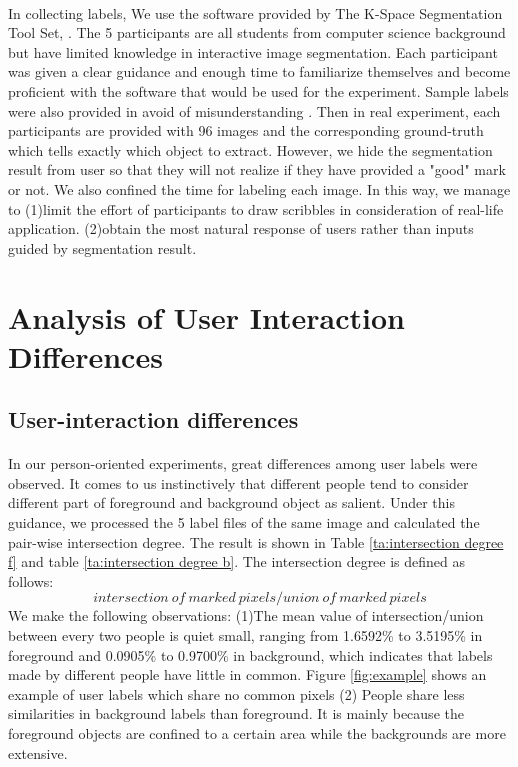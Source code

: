 \documentclass[runningheads,a4paper]{llncs}
\begin{document}
\paragraph{}In collecting labels, We use the software provided by The K-Space Segmentation Tool Set, \citep{mcguinness2008k}. The 5 participants are all students from computer science background but have limited knowledge in interactive image segmentation. Each participant was given a clear guidance and enough time to familiarize themselves and become proficient with the software that would be used for the experiment. Sample labels were also provided in avoid of misunderstanding . Then in real experiment, each participants are provided with 96 images and the corresponding ground-truth which tells exactly which object to extract. However, we hide the segmentation result from user so that they will not realize if they have provided a "good" mark or not. We also confined the time for labeling each image. In this way, we manage to (1)limit the effort of participants to draw scribbles in consideration of real-life application.
(2)obtain the most natural response of users rather than inputs guided by segmentation result.
\section{Analysis of User Interaction Differences}


\subsection{User-interaction differences}
\paragraph{}In our person-oriented experiments, great differences among user labels were observed. It comes to us instinctively that different people tend to consider different part of foreground and background object as salient. Under this guidance, we processed the 5 label files of the same image and calculated the pair-wise intersection degree. The result is shown in Table \ref{ta:intersection degree f} and table \ref{ta:intersection degree b}. The intersection degree is defined as follows:
$$intersection\ of\ marked\ pixels/union\ of\ marked\ pixels$$
We make the following observations: (1)The mean value of intersection/union between every two people is quiet small, ranging from 1.6592\% to 3.5195\% in foreground and 0.0905\% to 0.9700\% in background, which indicates that labels made by different people have little in common. Figure \ref{fig:example} shows an example of user labels which share no common pixels (2) People share less similarities in background labels than foreground. It is mainly because the foreground objects are confined to a certain area while the backgrounds are more extensive.
\end{document}
